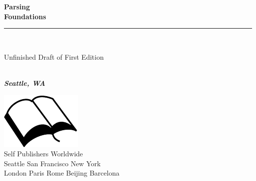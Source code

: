 \documentclass{book}
\makeatletter
\newcommand{\booksubtitle}{A Study of Data and Parsing}
\newcommand{\authorsubtitle}{Seattle, WA}
\newcommand{\bookauthor}{\@author}
\makeatother
\begin{document}
\begin{titlepage}
\begin{flushleft}

\textbf{\fontsize{48}{54}\selectfont Parsing\\Foundations\\}

\par\noindent\rule{\textwidth}{4pt}\\


\begin{flushright}
\Large Unfinished Draft of First Edition
\end{flushright}

\vspace{\fill}

\textbf{\large \bookauthor}\\[3.5pt]
\textbf{\large \textit{\authorsubtitle}}

\vspace{\fill}

\begin{center}
\includegraphics{booksvg.pdf}\\[4pt]
\small{Self Publishers Worldwide\\
Seattle San Francisco New York\\
London Paris Rome Beijing Barcelona}
\end{center}

\end{flushleft}
\end{titlepage}
\restoregeometry
\end{document}
